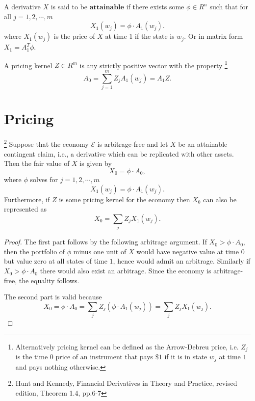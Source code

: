 \begin{definition}
A derivative $X$ is said to be $\mathbf{attainable}$ if there exists some 
$\phi\in R^n$ such that for all $j=1,2,\cdots,m$
\begin{equation}
  X_1(w_j) = \phi\cdot A_1(w_j).
\end{equation}
where $X_1(w_j)$ is the price of $X$ at time $1$ if the state is $w_j$.
Or in matrix form $X_1=A_1^T \phi$.
\end{definition}

\begin{definition}
A pricing kernel $Z\in R^m$ is any strictly positive vector with the
property
\footnote{Alternatively pricing kernel can be defined as the Arrow-Debreu 
  price, i.e. $Z_j$ is the time $0$ price of an instrument that pays $\$1$
  if it is in state $w_j$ at time $1$ and pays nothing otherwise.}
\begin{equation}
  A_0 = \sum_{j=1}^m Z_j A_1(w_j) = A_1 Z.
\end{equation}
\end{definition}


\section{Pricing}

\begin{theorem} \label{T:price}
\footnote{Hunt and Kennedy, Financial Derivatives in Theory and Practice, 
    revised edition, Theorem 1.4, pp.6-7}
Suppose that the economy $\mathcal{E}$ is arbitrage-free and let $X$ be an
attainable contingent claim, i.e., a derivative which can be replicated with
other assets. Then the fair value of $X$ is given by 
\begin{equation}
  X_0 = \phi\cdot A_0,
\end{equation}
where $\phi$ solves for $j=1,2,\cdots,m$
\[
  X_1(w_j) = \phi\cdot A_1(w_j).
\]
Furthermore, if $Z$ is some pricing kernel for the economy then $X_0$ can also
be represented as
\[
  X_0 = \sum_j Z_j X_1(w_j).
\]
\end{theorem}
\begin{proof}
The first part follows by the following arbitrage argument. 
If $X_0>\phi\cdot A_0$, then
the portfolio of $\phi$ minus one unit of $X$ would have negative value at time
$0$ but value zero at all states of time $1$, hence would admit an arbitrage.
Similarly if $X_0>\phi\cdot A_0$ there would also exist an arbitrage. Since the
economy is arbitrage-free, the equality follows.

The second part is valid because
\[
  X_0=\phi\cdot A_0 = \sum_j Z_j (\phi\cdot A_1(w_j)) = \sum_j Z_j X_1(w_j).
\]
\end{proof}


